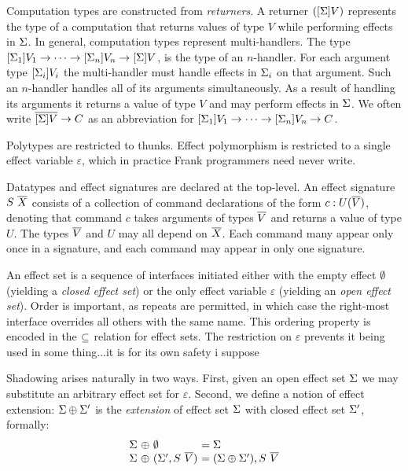 Computation types are constructed from \emph{returners}.  A returner
$([\Sigma]V)$ represents the type of a computation that returns
values of type $V$ while performing effects in $\Sigma$.
%
In general, computation types represent multi-handlers. The type
$[\Sigma_1]V_1 \to \dots \to [\Sigma_n]V_n \to
[\Sigma]V$,
%
is the type of an $n$-handler. For each argument type
$[\Sigma_i]V_i$ the multi-handler must handle effects in
$\Sigma_i$ on that argument. Such an $n$-handler handles all of its
arguments simultaneously. As a result of handling its arguments it
returns a value of type $V$ and may perform effects in $\Sigma$.
%
We often write $\overline{[\Sigma]V} \to C$ as an abbreviation for
$[\Sigma_1]V_1 \to \dots \to [\Sigma_n]V_n \to C$.

Polytypes are restricted to thunks. Effect polymorphism is restricted
to a single effect variable $\varepsilon$, which in practice Frank
programmers need never write.

Datatypes and effect signatures are declared at the top-level. An
effect signature $S~\overline{X}$ consists of a collection of command
declarations of the form $c:U(\overline{V})$, denoting that command $c$
takes arguments of types $\overline{V}$ and returns a value of type
$U$. The types $\overline{V}$ and $U$ may all depend on $\overline{X}$. Each
command many appear only once in a signature, and each command may
appear in only one signature.

An effect set is a sequence of interfaces initiated either with the empty
effect $\emptyset$ (yielding a \emph{closed effect set}) or the only effect
variable $\varepsilon$ (yielding an \emph{open effect set}). Order is
important, as repeats are permitted, in which case the right-most interface
overrides all others with the same name. This ordering property is encoded in
the $\subseteq$ relation for effect sets. The restriction on $\varepsilon$ prevents
it being used in some thing...it is for its own safety i suppose

Shadowing arises
naturally in two ways. First, given an open effect set $\Sigma$ we may
substitute an arbitrary effect set for $\varepsilon$. Second, we define a
notion of effect extension: $\Sigma \oplus \Sigma'$ is the \emph{extension} of
effect set $\Sigma$ with closed effect set $\Sigma'$, formally:
%
\[\ba{@{\sigs~\oplus~}l@{~}l@{}}
\emptyset               &= \sigs \\
(\sigs', \sig~\many{V}) &= (\sigs \oplus \sigs'), \sig~\many{V} \\
\ea\]


